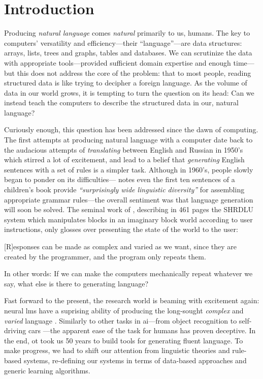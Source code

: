 \chapter{Introduction}
\label{chap:intro}
Producing \emph{natural language} comes \emph{natural} primarily to us, humans.
The key to computers' versatility and efficiency---their ``language''---are data structures: arrays, lists, trees and graphs, tables and databases.
We can scrutinize the data with appropriate tools---provided sufficient domain expertise and enough time---but this does not address the core of the problem: that to most people, reading structured data is like trying to decipher a foreign language. As the volume of data in our world grows, it is tempting to turn the question on its head: Can we instead teach the computers to describe the structured data in our, natural language?


Curiously enough, this question has been addressed since the dawn of computing. The first attempts at producing natural language with a computer date back to the audacious attempts of \emph{translating} between English and Russian in 1950's \cite{sheridan1955research} which stirred a lot of excitement, and lead to a belief that \emph{generating} English sentences with a set of rules is a simpler task. Although in 1960's, people slowly began to ponder on its difficulties---\citet{yngve1961random} notes even the first ten sentences of a children's book provide \emph{``surprisingly wide linguistic diversity''} for assembling appropriate grammar rules---the overall sentiment was that language generation will soon be solved. The seminal work of \citet{winograd1971procedures}, describing in 461 pages the SHRDLU system which manipulates blocks in an imaginary block world according to user instructions, only glosses over presenting the state of the world to the user:
\begin{pquotation}{\citealp[p.384]{winograd1971procedures}}
    [R]esponses can be made as complex and varied as we want, since they are created by the programmer, and the program only repeats them.
\end{pquotation}
In other words: If we can make the computers mechanically repeat whatever we say, what else is there to generating language?

Fast forward to the present, the research world is beaming with excitement again: neural \acp{lm} have a suprising ability of producing the long-sought \emph{complex} and \emph{varied} language \cite{radford2019language,brown2020language}. Similarly to other tasks in \ac{ai}---from object recognition \cite{papert1966summer} to self-driving cars \cite{autonomouscars}---the apparent ease of the task for humans has proven deceptive. In the end, ot took us 50 years to build tools for generating fluent language. To make progress, we had to shift our attention from linguistic theories and rule-based systems, re-defining our systems in terms of data-based approaches and generic learning algorithms.

